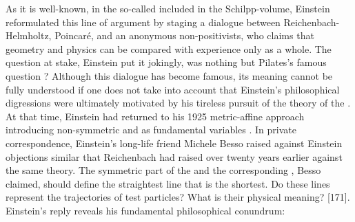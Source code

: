 \documentclass[draft]{article}
\begin{document}
As it is well-known, in the so-called  included in the Schilpp-volume, Einstein reformulated this line of argument by staging a dialogue between Reichenbach-Helmholtz, Poincaré, and an anonymous non-positivists, who claims that geometry and physics can be compared with experience only as a whole. The question at stake, Einstein put it jokingly, was nothing but Pilates's famous question ? Although this dialogue has become famous, its meaning cannot be fully understood if one does not take into account that Einstein's philosophical digressions were ultimately motivated by his tireless pursuit of the theory of the . At that time, Einstein had returned to his 1925 metric-affine approach introducing non-symmetric \gmn and \Gtmn as fundamental variables \cite{Einstein1945,Einstein1945-04}. In private correspondence, Einstein's long-life friend Michele Besso raised against Einstein objections similar that Reichenbach had raised over twenty years earlier against the same theory. The symmetric part of the \gmn and the corresponding \Gtmn, Besso claimed, should define the straightest line that is the shortest. Do these lines represent the trajectories of test particles? What is their physical meaning? [171]. Einstein's reply reveals his fundamental philosophical conundrum:

\end{document}
